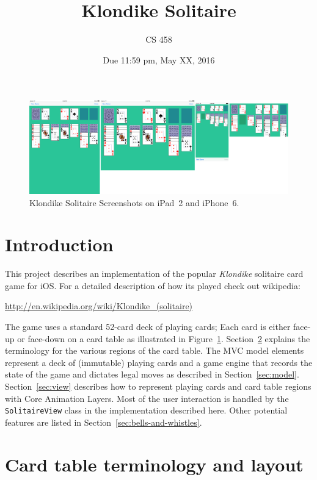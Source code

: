 \documentclass[11pt]{article}
\title{Klondike Solitaire}
\author{CS 458}
\date{Due 11:59 pm, May XX, 2016}
\begin{document}
\maketitle


\begin{figure}[ht!] %
   \centering
   \includegraphics[width=\textwidth]{screenshots}
  \caption{Klondike Solitaire Screenshots on iPad~2 and iPhone~6.}
   \label{fig:screenshot}
\end{figure}

\section{Introduction}

This project describes an implementation of the popular 
{\em Klondike} solitaire card game for iOS.
For a detailed description of how its played check out wikipedia:
\begin{flushleft}
\url{http://en.wikipedia.org/wiki/Klondike_(solitaire)}
\end{flushleft}

The game uses a standard 52-card deck of playing cards;
Each card is either face-up or face-down on a card table 
as illustrated in Figure~\ref{fig:screenshot}.
Section~\ref{sec:terms} explains the terminology for the
various regions of the card table. The MVC model elements represent
a deck of (immutable) playing cards and a game engine that records
the state of the game and dictates legal moves as
described in Section~\ref{sec:model}.
Section~\ref{sec:view} describes how to represent playing cards
and card table regions with Core Animation Layers.
Most of the user interaction is handled by the {\tt SolitaireView}
class in the implementation described here.
Other potential features are listed in Section~\ref{sec:bells-and-whistles}.

\pagebreak

\section{Card table terminology and layout} \label{sec:terms}
\end{document}
